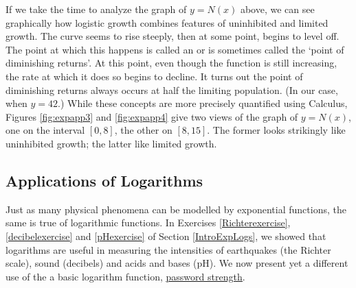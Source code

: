 If we take the time to analyze the graph of $y=N(x)$ above, we can see graphically how logistic growth combines  features of uninhibited and limited growth.  The curve seems to rise steeply, then at some point, begins to level off.  The point at which this happens is called an    or is sometimes called the `point of diminishing returns'.  At this point, even though the function is still increasing, the rate at which it does so begins to decline.  It turns out the point of diminishing returns always occurs at half the limiting population.  (In our case, when $y=42$.)  While these concepts are more precisely quantified using Calculus, Figures \ref{fig:expapp3} and \ref{fig:expapp4} give two views of the graph of $y=N(x)$, one on the interval $[0,8]$, the other on $[8,15]$. The former looks strikingly like uninhibited growth; the latter like limited growth.



\subsection{Applications of Logarithms}

Just as many physical phenomena can be modelled by exponential functions, the same is true of logarithmic functions.   In Exercises \ref{Richterexercise},  \ref{decibelexercise} and \ref{pHexercise} of Section \ref{IntroExpLogs}, we showed that logarithms are useful in measuring the intensities of earthquakes (the Richter scale), sound (decibels) and acids and bases (pH).  We now present yet a different use of the a basic logarithm function, \href{http://en.wikipedia.org/wiki/Password_strength}{\underline{password strength}}.

\medskip

